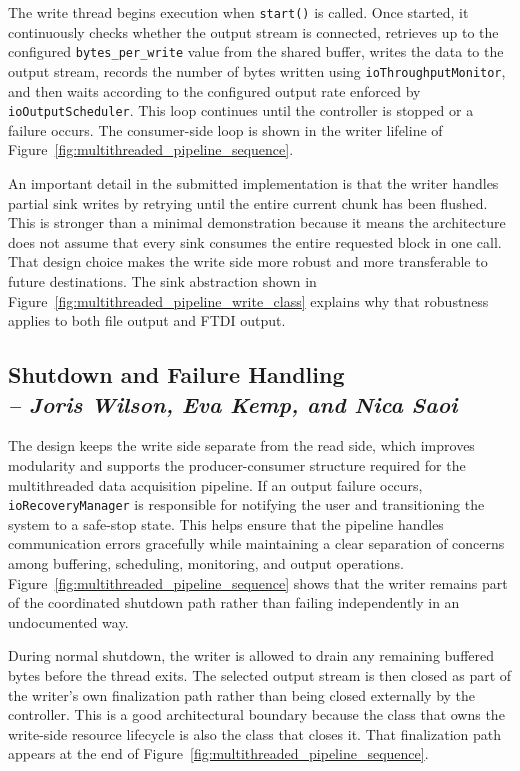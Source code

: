 The write thread begins execution when \texttt{start()} is called. Once started, it continuously checks whether the output stream is connected, retrieves up to the configured \texttt{bytes\_per\_write} value from the shared buffer, writes the data to the output stream, records the number of bytes written using \texttt{ioThroughputMonitor}, and then waits according to the configured output rate enforced by \texttt{ioOutputScheduler}. This loop continues until the controller is stopped or a failure occurs. The consumer-side loop is shown in the writer lifeline of Figure~\ref{fig:multithreaded_pipeline_sequence}.

An important detail in the submitted implementation is that the writer handles partial sink writes by retrying until the entire current chunk has been flushed. This is stronger than a minimal demonstration because it means the architecture does not assume that every sink consumes the entire requested block in one call. That design choice makes the write side more robust and more transferable to future destinations. The sink abstraction shown in Figure~\ref{fig:multithreaded_pipeline_write_class} explains why that robustness applies to both file output and FTDI output.

\subsection{Shutdown and Failure Handling \\
\small{\textit{-- Joris Wilson, Eva Kemp, and Nica Saoi}}}
\label{Section::Shutdown and Failure Handling}

The design keeps the write side separate from the read side, which improves modularity and supports the producer-consumer structure required for the multithreaded data acquisition pipeline. If an output failure occurs, \texttt{ioRecoveryManager} is responsible for notifying the user and transitioning the system to a safe-stop state. This helps ensure that the pipeline handles communication errors gracefully while maintaining a clear separation of concerns among buffering, scheduling, monitoring, and output operations. Figure~\ref{fig:multithreaded_pipeline_sequence} shows that the writer remains part of the coordinated shutdown path rather than failing independently in an undocumented way.

During normal shutdown, the writer is allowed to drain any remaining buffered bytes before the thread exits. The selected output stream is then closed as part of the writer's own finalization path rather than being closed externally by the controller. This is a good architectural boundary because the class that owns the write-side resource lifecycle is also the class that closes it. That finalization path appears at the end of Figure~\ref{fig:multithreaded_pipeline_sequence}.

